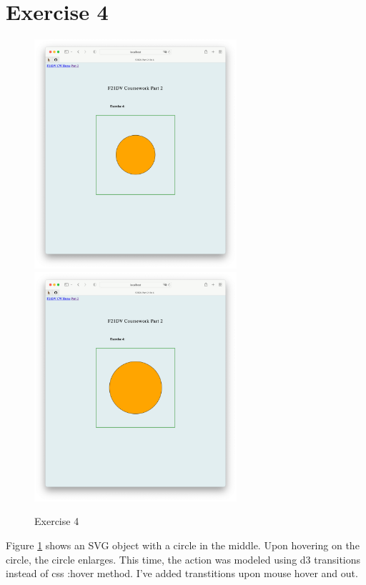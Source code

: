 \documentclass{scrreprt}
\begin{document}
\section{Exercise 4}
\begin{figure}[!ht]
    \centering
    \includegraphics[width = 7.5cm]{images/ex4_1.png}
    \includegraphics[width = 7.5cm]{images/ex4_2.png}
    \label{fig:ex4}
    \caption{Exercise 4}
\end{figure}
\FloatBarrier
% 
Figure \ref{fig:ex4} shows an SVG object with a circle in the middle. Upon hovering on the circle, the circle enlarges. This time, the action was modeled using d3 transitions instead of css :hover method. I've added transtitions upon mouse hover and out.

\newpage
\end{document}
